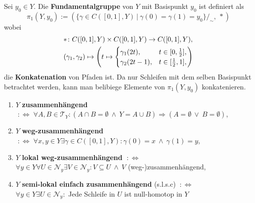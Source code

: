\documentclass[12pt, aspectratio=169]{beamer}
\newcommand{\T}[0]{\mathcal{T}}
\newcommand{\NB}[0]{\mathcal{N}}
\begin{document}
\begin{frame}
    \begin{definition}
         {
            Sei $y_0 \in Y$. Die \textbf{Fundamentalgruppe} von $Y$ mit Basispunkt $y_0$ ist definiert als
            \begin{equation*}
            \pi_1(Y, y_0) := (\{\gamma \in C([0,1],Y) \: | \: \gamma(0) = \gamma(1) = y_0\}/_{\sim}, \: *)
            \end{equation*}
        }
         {
        wobei 
        \begin{align*} 
          &*\colon C([0,1], Y) \times C([0,1], Y) \to C([0,1], Y), \\
          &(\gamma_1, \gamma_2) \mapsto \left(t \mapsto \begin{cases}
          \gamma_1(2t),   &t \in [0, {1 \over 2}], \\
          \gamma_2(2t-1), &t \in [{1 \over 2}, 1],
            \end{cases}\right)
        \end{align*}
        die \textbf{Konkatenation} von Pfaden ist. 
        Da nur Schleifen mit dem selben Basispunkt betrachtet werden, kann man belibiege Elemente von $\pi_1(Y, y_0)$ konkatenieren.
        }    
    \end{definition}
\end{frame}

\begin{frame}
\begin{definition}
    \begin{enumerate}
        \item $Y$ \textbf{zusammenhängend} $\;:\Longleftrightarrow\; \forall A,B \in \T_Y\colon (A \cap B = \emptyset \: \land \: Y = A \cup B) \Rightarrow (A = \emptyset \: \lor \: B = \emptyset)$,
        \item $Y$ \textbf{weg-zusammenhängend} $\;:\Longleftrightarrow\; \forall x,y \in Y \exists\gamma \in C([0,1], Y)\colon \gamma(0) = x \: \land \: \gamma(1) = y$,
        \item $Y$ \textbf{lokal weg-zusammenhängend} $\;:\Longleftrightarrow$ \\ $\forall y \in Y\forall U \in \NB_y\exists V\in \NB_y\colon V \subseteq U \: \land \: V$ (weg-)zusammenhängend,
        \item $Y$ \textbf{semi-lokal einfach zusammenhängend} (s.l.s.c) $\: :\Longleftrightarrow$ \\ $\forall y\in Y\exists U \in \NB_y\colon$ Jede Schleife in $U$ ist null-homotop in $Y$
    \end{enumerate}
\end{definition}
\end{frame}
\end{document}
